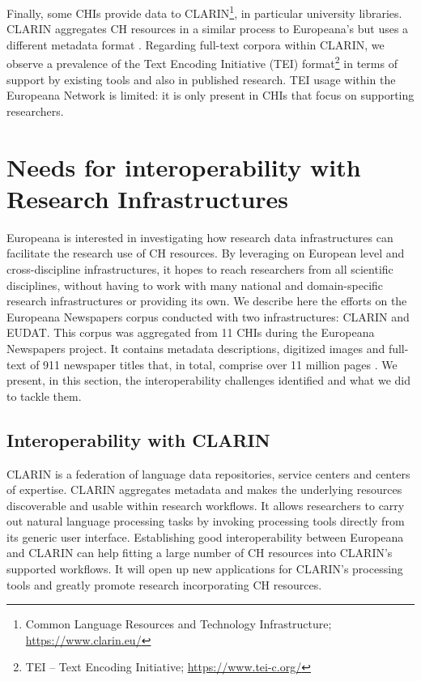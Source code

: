\documentclass[a4paper,UKenglish,cleveref, autoref]{oasics-v2019}
\begin{document}
Finally, some CHIs provide data to 
CLARIN\footnote{Common Language Resources and Technology Infrastructure; \url{https://www.clarin.eu/}},
in particular university libraries. CLARIN aggregates CH resources in a similar process to Europeana's but uses a different metadata format \cite{cmdi}. Regarding full-text corpora within CLARIN, we observe a prevalence of the Text Encoding Initiative (TEI)
format\footnote{TEI -- Text Encoding Initiative; \url{https://www.tei-c.org/}}
in terms of support by existing tools and also in published research. TEI usage within the Europeana Network is limited: it is only present in CHIs that focus on supporting researchers. 

\section{Needs for interoperability with Research Infrastructures}
\label{sec:needsforinteroperability}
Europeana is interested in investigating how research data infrastructures can facilitate the research use of CH resources. By leveraging on European level and cross-discipline infrastructures, it hopes to reach researchers from all scientific disciplines, without having to work with many national and domain-specific research infrastructures or providing its own. We describe here the efforts on the Europeana Newspapers corpus conducted with two infrastructures: CLARIN and EUDAT. This corpus was aggregated from 11 CHIs during the Europeana Newspapers project. It contains metadata descriptions, digitized images and full-text of 911 newspaper titles that, in total, comprise over 11 million pages \cite{Dunning15}. We present, in this section, the interoperability challenges identified and what we did to tackle them. 

\subsection{Interoperability with CLARIN}
\label{sec:interoperabilitywithclarin}
CLARIN is a federation of language data repositories, service centers and centers of expertise. CLARIN aggregates metadata and makes the underlying resources discoverable and usable within research workflows. It allows researchers to carry out natural language processing tasks by invoking processing tools directly from its generic user interface. Establishing good interoperability between Europeana and CLARIN can help fitting a large number of CH resources into CLARIN's supported workflows. It will open up new applications for CLARIN's processing tools and greatly promote research incorporating CH resources.
\end{document}
